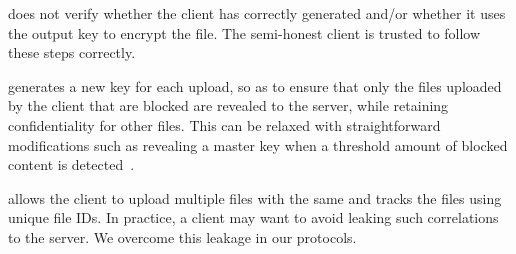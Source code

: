

\enumListStart
\item \contentModFunc does not verify whether the client has correctly generated \contentToken{\clientData} and/or whether it uses the output key to encrypt the file. The semi-honest client is trusted to follow these steps correctly. 
\item \contentModFunc generates a new key for each upload, so as to ensure that only the files uploaded by the client that are blocked are revealed to the server, while retaining confidentiality for other files. This can be relaxed with straightforward modifications such as revealing a master key when a threshold amount of blocked content is detected~\cite{bhowmick2021apple}.

\item \contentModFunc allows the client to upload multiple files with the same \contentToken{\clientData} and tracks the files using unique file IDs. In practice, a client may want to avoid leaking such correlations to the server. We overcome this leakage in our protocols.
\enumListEnd



